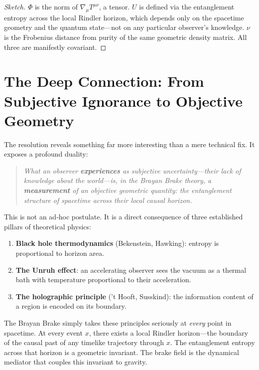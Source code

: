 \documentclass[11pt]{article}
\begin{document}
\begin{proof}[Sketch]
\(\Phi\) is the norm of \(\nabla_\mu T^{\mu\nu}\), a tensor. \(U\) is defined via the entanglement entropy across the local Rindler horizon, which depends only on the spacetime geometry and the quantum state—not on any particular observer's knowledge. \(\nu\) is the Frobenius distance from purity of the same geometric density matrix. All three are manifestly covariant.
\end{proof}

\section{The Deep Connection: From Subjective Ignorance to Objective Geometry}
\label{sec:deep}

The resolution reveals something far more interesting than a mere technical fix. It exposes a profound duality:

\begin{quote}
\textit{What an observer \textbf{experiences} as subjective uncertainty—their lack of knowledge about the world—is, in the Brayan Brake theory, a \textbf{measurement} of an objective geometric quantity: the entanglement structure of spacetime across their local causal horizon.}
\end{quote}

This is not an ad‑hoc postulate. It is a direct consequence of three established pillars of theoretical physics:

\begin{enumerate}[leftmargin=2em]
    \item \textbf{Black hole thermodynamics} (Bekenstein, Hawking): entropy is proportional to horizon area.
    \item \textbf{The Unruh effect}: an accelerating observer sees the vacuum as a thermal bath with temperature proportional to their acceleration.
    \item \textbf{The holographic principle} ('t Hooft, Susskind): the information content of a region is encoded on its boundary.
\end{enumerate}

The Brayan Brake simply takes these principles seriously at \emph{every} point in spacetime. At every event \(x\), there exists a local Rindler horizon—the boundary of the causal past of any timelike trajectory through \(x\). The entanglement entropy across that horizon is a geometric invariant. The brake field is the dynamical mediator that couples this invariant to gravity.
\end{document}
